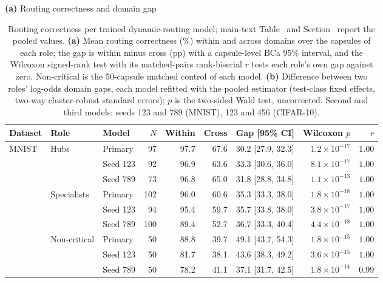 \begin{table}[!htbp]
    \centering
    \caption{Routing correctness per trained dynamic-routing model; main-text Table~\MainTabRouting{} and Section~\MainSecCifar{} report the pooled values. \textbf{(a)} Mean routing correctness (\%) within and across domains over the capsules of each role; the gap is within minus cross (pp) with a capsule-level BCa 95\% interval, and the Wilcoxon signed-rank test with its matched-pairs rank-biserial $r$ tests each role's own gap against zero. Non-critical is the 50-capsule matched control of each model. \textbf{(b)} Difference between two roles' log-odds domain gaps, each model refitted with the pooled estimator (test-class fixed effects, two-way cluster-robust standard errors); $p$ is the two-sided Wald test, uncorrected. Second and third models: seeds 123 and 789 (MNIST), 123 and 456 (CIFAR-10).}
    \label{tabS:routing_per_model}
    \scriptsize
    \setlength{\tabcolsep}{3.5pt}
    \textbf{(a)} Routing correctness and domain gap\\[2pt]
    \begin{tabular}{@{}lllrrrlrr@{}}
        \toprule
        \textbf{Dataset} & \textbf{Role} & \textbf{Model} & \textbf{$N$} & \textbf{Within} & \textbf{Cross} & \textbf{Gap [95\% CI]} & \textbf{Wilcoxon $p$} & \textbf{$r$} \\
        \midrule
        MNIST & \multirow{3}{*}{Hubs} & Primary & 97 & 97.7 & 67.6 & 30.2 [27.9, 32.3] & $1.2\times10^{-17}$ & $1.00$ \\
         &  & Seed 123 & 92 & 96.9 & 63.6 & 33.3 [30.6, 36.0] & $8.1\times10^{-17}$ & $1.00$ \\
         &  & Seed 789 & 73 & 96.8 & 65.0 & 31.8 [28.8, 34.8] & $1.1\times10^{-13}$ & $1.00$ \\
         & \multirow{3}{*}{Specialists} & Primary & 102 & 96.0 & 60.6 & 35.3 [33.3, 38.0] & $1.8\times10^{-18}$ & $1.00$ \\
         &  & Seed 123 & 94 & 95.4 & 59.7 & 35.7 [33.8, 38.0] & $3.8\times10^{-17}$ & $1.00$ \\
         &  & Seed 789 & 100 & 89.4 & 52.7 & 36.7 [33.3, 40.4] & $4.4\times10^{-18}$ & $1.00$ \\
         & \multirow{3}{*}{Non-critical} & Primary & 50 & 88.8 & 39.7 & 49.1 [43.7, 54.3] & $1.8\times10^{-15}$ & $1.00$ \\
         &  & Seed 123 & 50 & 81.7 & 38.1 & 43.6 [38.3, 49.2] & $3.6\times10^{-15}$ & $1.00$ \\
         &  & Seed 789 & 50 & 78.2 & 41.1 & 37.1 [31.7, 42.5] & $1.8\times10^{-14}$ & $0.99$ \\

\end{tabular}
\end{table}
